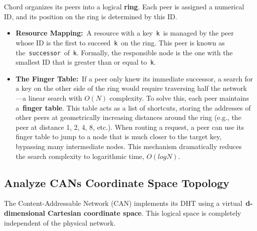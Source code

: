 \documentclass{scrbook}
\begin{document}
Chord organizes its peers into a logical \textbf{ring}. Each peer is assigned
a numerical ID, and its position on the ring is determined by this ID.

\begin{itemize}
\item
  \textbf{Resource Mapping:}~A resource with a key~\texttt{k}~is managed
  by the peer whose ID is the first to succeed~\texttt{k}~on the ring.
  This peer is known as the~\texttt{successor}~of~\texttt{k}. Formally,
  the responsible node is the one with the smallest ID that is greater
  than or equal to~\texttt{k}.
\item
  \textbf{The Finger Table:}~If a peer only knew its immediate
  successor, a search for a key on the other side of the ring would
  require traversing half the network---a linear search with $O(N)$
  complexity. To solve this, each peer maintains a~\textbf{finger
  table}. This table acts as a list of shortcuts, storing the addresses
  of other peers at geometrically increasing distances around the ring
  (e.g., the peer at distance 1, 2, 4, 8, etc.). When routing a request,
  a peer can use its finger table to jump to a node that is much closer
  to the target key, bypassing many intermediate nodes. This mechanism
  dramatically reduces the search complexity to logarithmic
  time, $O(log N)$.
\end{itemize}

\subsection{Analyze CAN\textquotesingle s Coordinate Space Topology}

The Content-Addressable Network (CAN) implements its DHT using a
virtual~\textbf{d-dimensional Cartesian coordinate space}. This logical
space is completely independent of the physical network.
\end{document}
